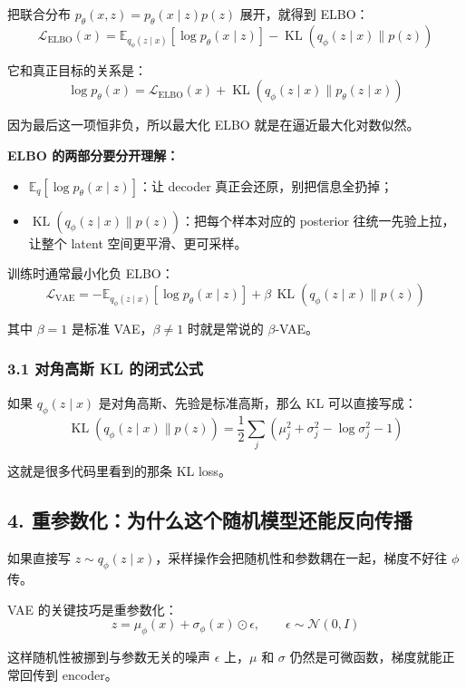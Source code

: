 把联合分布 $p_\theta(x,z)=p_\theta(x\mid z)p(z)$ 展开，就得到 ELBO：
\[
\mathcal{L}_{\text{ELBO}}(x)
= \mathbb{E}_{q_\phi(z\mid x)}[\log p_\theta(x\mid z)]
- \operatorname{KL}(q_\phi(z\mid x)\|p(z))
\]

它和真正目标的关系是：
\[
\log p_\theta(x) = \mathcal{L}_{\text{ELBO}}(x) + \operatorname{KL}(q_\phi(z\mid x)\|p_\theta(z\mid x))
\]

因为最后这一项恒非负，所以最大化 ELBO 就是在逼近最大化对数似然。

\begin{summarybox}
\textbf{ELBO 的两部分要分开理解：}
\begin{itemize}[leftmargin=1.5em]
  \item $\mathbb{E}_{q}[\log p_\theta(x\mid z)]$：让 decoder 真正会还原，别把信息全扔掉；
  \item $\operatorname{KL}(q_\phi(z\mid x)\|p(z))$：把每个样本对应的 posterior 往统一先验上拉，让整个 latent 空间更平滑、更可采样。
\end{itemize}
\end{summarybox}

训练时通常最小化负 ELBO：
\[
\mathcal{L}_{\text{VAE}} = -\mathbb{E}_{q_\phi(z\mid x)}[\log p_\theta(x\mid z)] + \beta\,\operatorname{KL}(q_\phi(z\mid x)\|p(z))
\]

其中 $\beta=1$ 是标准 VAE，$\beta\neq1$ 时就是常说的 $\beta$-VAE。

\subsubsection{3.1 对角高斯 KL 的闭式公式}

如果 $q_\phi(z\mid x)$ 是对角高斯、先验是标准高斯，那么 KL 可以直接写成：
\[
\operatorname{KL}(q_\phi(z\mid x)\|p(z))
= \frac{1}{2}\sum_j\left(\mu_j^2 + \sigma_j^2 - \log \sigma_j^2 - 1\right)
\]

这就是很多代码里看到的那条 KL loss。

\subsection{4. 重参数化：为什么这个随机模型还能反向传播}

如果直接写 $z\sim q_\phi(z\mid x)$，采样操作会把随机性和参数耦在一起，梯度不好往 $\phi$ 传。

VAE 的关键技巧是重参数化：
\[
z = \mu_\phi(x) + \sigma_\phi(x)\odot\epsilon,
\qquad \epsilon\sim\mathcal{N}(0,I)
\]

这样随机性被挪到与参数无关的噪声 $\epsilon$ 上，$\mu$ 和 $\sigma$ 仍然是可微函数，梯度就能正常回传到 encoder。

